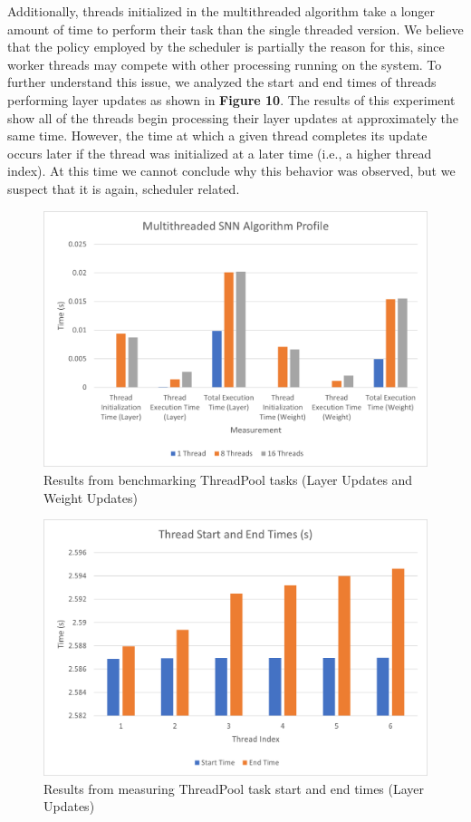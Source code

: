 \documentclass[journal]{IEEEtran}
\begin{document}
Additionally, threads initialized in the multithreaded algorithm take a longer amount of time to perform their task than the single threaded version. We believe that the policy employed by the scheduler is partially the reason for this, since worker threads may compete with other processing running on the system. To further understand this issue, we analyzed the start and end times of threads performing layer updates as shown in \textbf{Figure 10}. The results of this experiment show all of the threads begin processing their layer updates at approximately the same time. However, the time at which a given thread completes its update occurs later if the thread was initialized at a later time (i.e., a higher thread index). At this time we cannot conclude why this behavior was observed, but we suspect that it is again, scheduler related. 

\begin{figure}[!t]
\centering
\includegraphics[width=\linewidth]{thread_profile.png}
\caption{Results from benchmarking ThreadPool tasks (Layer Updates and Weight Updates)}
\label{fig_sim}
\end{figure}

\begin{figure}[!t]
\centering
\includegraphics[width=\linewidth]{thread_start_times.png}
\caption{Results from measuring ThreadPool task start and end times (Layer Updates)}
\label{fig_sim}
\end{figure}
\end{document}

